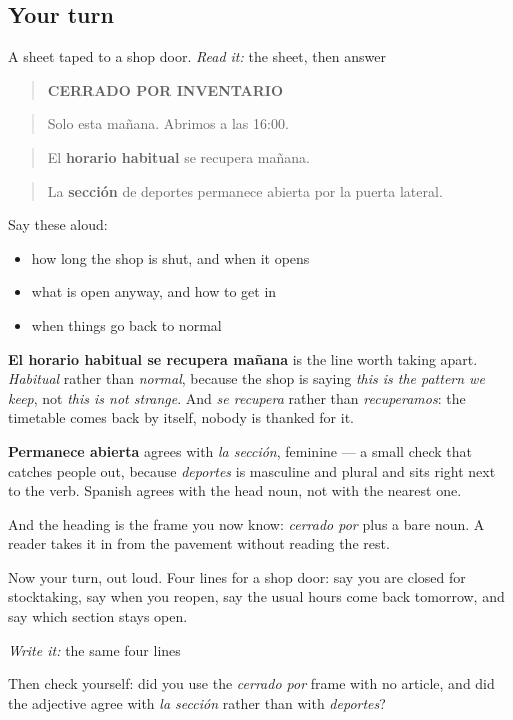 \subsection*{Your turn}
A sheet taped to a shop door. \emph{Read it:} the sheet, then answer

\begin{quote}
\textbf{CERRADO POR INVENTARIO}
\end{quote}

\begin{quote}
Solo esta mañana. Abrimos a las 16:00.
\end{quote}

\begin{quote}
El \textbf{horario habitual} se recupera mañana.
\end{quote}

\begin{quote}
La \textbf{sección} de deportes permanece abierta por la puerta lateral.
\end{quote}

Say these aloud:

\begin{itemize}
\raggedright
  \item how long the shop is shut, and when it opens
  \item what is open anyway, and how to get in
  \item when things go back to normal
\end{itemize}

\begin{culture}
\textbf{El horario habitual se recupera mañana} is the line worth taking apart. \emph{Habitual} rather than \emph{normal}, because the shop is saying \emph{this is the pattern we keep}, not \emph{this is not strange}. And \emph{se recupera} rather than \emph{recuperamos}: the timetable comes back by itself, nobody is thanked for it.

\textbf{Permanece abierta} agrees with \emph{la sección}, feminine — a small check that catches people out, because \emph{deportes} is masculine and plural and sits right next to the verb. Spanish agrees with the head noun, not with the nearest one.

And the heading is the frame you now know: \emph{cerrado por} plus a bare noun. A reader takes it in from the pavement without reading the rest.
\end{culture}

\begin{tcolorbox}[breakable,colback=teal!4,colframe=teal!35!black,title={Before you move on}]
Now your turn, out loud. Four lines for a shop door: say you are closed for stocktaking, say when you reopen, say the usual hours come back tomorrow, and say which section stays open.

\emph{Write it:} the same four lines

Then check yourself: did you use the \emph{cerrado por} frame with no article, and did the adjective agree with \emph{la sección} rather than with \emph{deportes}?
\end{tcolorbox}
